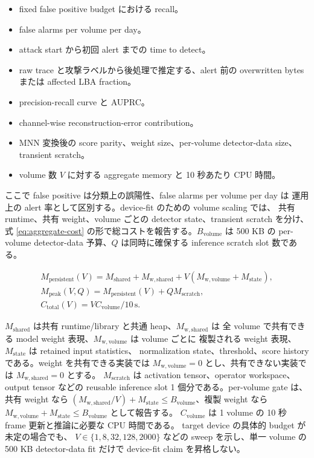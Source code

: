 \begin{itemize}
  \item fixed false positive budget における recall。
  \item false alarms per volume per day。
  \item attack start から初回 alert までの time to detect。
  \item raw trace と攻撃ラベルから後処理で推定する、alert 前の overwritten bytes
        または affected LBA fraction。
  \item precision-recall curve と AUPRC。
  \item channel-wise reconstruction-error contribution。
  \item MNN 変換後の score parity、weight size、per-volume detector-data size、
        transient scratch。
  \item volume 数 $V$ に対する aggregate memory と 10 秒あたり CPU 時間。
\end{itemize}

ここで false positive は分類上の誤陽性、false alarms per volume per day は
運用上の alert 率として区別する。device-fit のための volume scaling では、
共有 runtime、共有 weight、volume ごとの detector state、transient scratch を分け、
式 \eqref{eq:aggregate-cost} の形で総コストを報告する。$B_{\mathrm{volume}}$ は
500 KB の per-volume detector-data 予算、$Q$ は同時に確保する inference scratch slot 数である。

\begin{equation}
\begin{aligned}
  M_{\mathrm{persistent}}(V) =
  M_{\mathrm{shared}} + M_{\mathrm{w,shared}}
  + V \left(M_{\mathrm{w,volume}} + M_{\mathrm{state}}\right), \\
  M_{\mathrm{peak}}(V,Q) =
  M_{\mathrm{persistent}}(V) + Q M_{\mathrm{scratch}}, \\
  C_{\mathrm{total}}(V) =
  V C_{\mathrm{volume}} / 10\,\mathrm{s}.
\end{aligned}
  \label{eq:aggregate-cost}
\end{equation}

$M_{\mathrm{shared}}$ は共有 runtime/library と共通 heap、$M_{\mathrm{w,shared}}$ は
全 volume で共有できる model weight 表現、$M_{\mathrm{w,volume}}$ は volume ごとに
複製される weight 表現、$M_{\mathrm{state}}$ は retained input statistics、
normalization state、threshold、score history である。weight を共有できる実装では
$M_{\mathrm{w,volume}}=0$ とし、共有できない実装では $M_{\mathrm{w,shared}}=0$ とする。
$M_{\mathrm{scratch}}$ は activation tensor、operator workspace、output tensor などの
reusable inference slot 1 個分である。per-volume gate は、共有 weight なら
$(M_{\mathrm{w,shared}}/V)+M_{\mathrm{state}}\le B_{\mathrm{volume}}$、複製 weight なら
$M_{\mathrm{w,volume}}+M_{\mathrm{state}}\le B_{\mathrm{volume}}$ として報告する。
$C_{\mathrm{volume}}$ は 1 volume の 10 秒 frame 更新と推論に必要な CPU 時間である。
target device の具体的 budget が未定の場合でも、
$V \in \{1,8,32,128,2000\}$ などの sweep を示し、単一 volume の
500 KB detector-data fit だけで device-fit claim を昇格しない。

